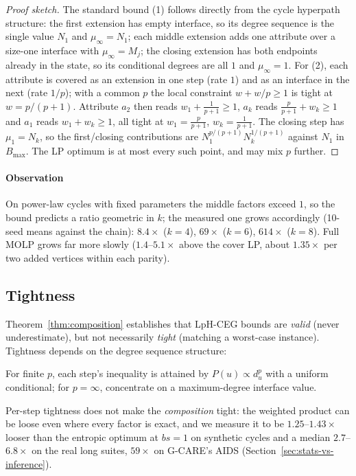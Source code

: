 \documentclass[sigconf, nonacm, acmthm=false]{acmart}
\begin{document}
\begin{proof}[Proof sketch]
The standard bound (1) follows directly from the cycle hyperpath
structure: the first extension has empty interface, so its degree
sequence is the single value $N_1$ and $\mu_\infty = N_1$; each middle
extension adds one attribute over a size-one interface with
$\mu_\infty = M_j$; the closing extension has both endpoints already in
the state, so its conditional degrees are all $1$ and $\mu_\infty = 1$.
For (2), each attribute is covered as an extension in one step (rate
$1$) and as an interface in the next (rate $1/p$); with a common $p$ the
local constraint $w + w/p \ge 1$ is tight at $w = p/(p+1)$. Attribute
$a_2$ then reads $w_1 + \frac{1}{p+1} \ge 1$, $a_k$ reads
$\frac{p}{p+1} + w_k \ge 1$ and $a_1$ reads $w_1 + w_k \ge 1$, all tight
at $w_1 = \frac{p}{p+1}$, $w_k = \frac{1}{p+1}$. The closing step has
$\mu_1 = N_k$, so the first/closing contributions are
$N_1^{p/(p+1)} N_k^{1/(p+1)}$ against $N_1$ in $B_{\max}$. The LP optimum
is at most every such point, and may mix $p$ further.
\end{proof}

\paragraph{Observation} On power-law cycles with
fixed parameters the middle factors exceed $1$, so the bound predicts a
ratio geometric in $k$; the measured one grows accordingly (10-seed means against the chain): $8.4\times$ ($k{=}4$), $69\times$
($k{=}6$), $614\times$ ($k{=}8$). Full MOLP grows far more slowly ($1.4$--$5.1\times$ above the cover LP, about $1.35\times$ per two added vertices within each parity).

\subsection{Tightness}

Theorem~\ref{thm:composition} establishes that LpH-CEG bounds are
\emph{valid} (never underestimate), but not necessarily \emph{tight}
(matching a worst-case instance).
Tightness depends on the degree sequence structure:

For finite $p$, each step's inequality is attained by $P(u)\propto d_u^p$ with a uniform conditional; for $p=\infty$, concentrate on a maximum-degree interface value.

Per-step tightness does not make the \emph{composition} tight: the
weighted product can be loose even where every factor is exact, and we
measure it to be $1.25$--$1.43\times$ looser than the entropic optimum at
$bs{=}1$ on synthetic cycles and a median $2.7$--$6.8\times$ on the real long suites, $59\times$ on G-CARE's AIDS (Section~\ref{sec:stats-vs-inference}).
\end{document}
